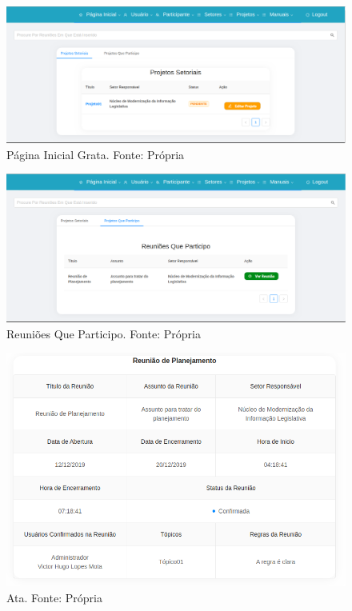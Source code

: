 \begin{figure}[H]
    \centering
    \includegraphics[width=1.0\textwidth]{figuras/pagina_inicial_grata.png}
    \caption{Página Inicial Grata. Fonte: Própria}
    \label{img:pagina_inicial_grata}
\end{figure}

\begin{figure}[H]
    \centering
    \includegraphics[width=1.0\textwidth]{figuras/reunioes_que_participo.png}
    \caption{Reuniões Que Participo. Fonte: Própria}
    \label{img:reunioes_que_participo}
\end{figure}

\begin{figure}[H]
    \centering
    \includegraphics[width=1.0\textwidth]{figuras/ata.png}
    \caption{Ata. Fonte: Própria}
    \label{img:ata}
\end{figure}

